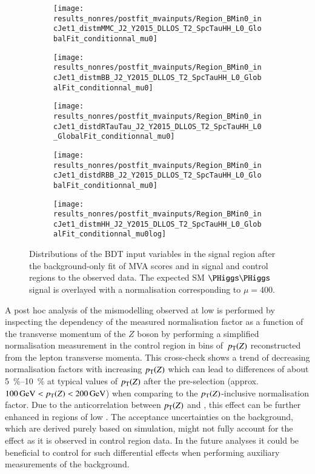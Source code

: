 \begin{figure}[htbp]
  \centering

  \begin{subfigure}{0.46\textwidth}
    \texttt{[image: results\_nonres/postfit\_mvainputs/Region\_BMin0\_incJet1\_distmMMC\_J2\_Y2015\_DLLOS\_T2\_SpcTauHH\_L0\_GlobalFit\_conditionnal\_mu0]}
  \end{subfigure}\hfill%
  \begin{subfigure}{0.46\textwidth}
    \texttt{[image: results\_nonres/postfit\_mvainputs/Region\_BMin0\_incJet1\_distmBB\_J2\_Y2015\_DLLOS\_T2\_SpcTauHH\_L0\_GlobalFit\_conditionnal\_mu0]}
  \end{subfigure}

  \begin{subfigure}{0.46\textwidth}
    \texttt{[image: results\_nonres/postfit\_mvainputs/Region\_BMin0\_incJet1\_distdRTauTau\_J2\_Y2015\_DLLOS\_T2\_SpcTauHH\_L0\_GlobalFit\_conditionnal\_mu0]}
  \end{subfigure}\hfill%
  \begin{subfigure}{0.46\textwidth}
    \texttt{[image: results\_nonres/postfit\_mvainputs/Region\_BMin0\_incJet1\_distdRBB\_J2\_Y2015\_DLLOS\_T2\_SpcTauHH\_L0\_GlobalFit\_conditionnal\_mu0]}
  \end{subfigure}

  \begin{subfigure}{0.46\textwidth}
    \texttt{[image: results\_nonres/postfit\_mvainputs/Region\_BMin0\_incJet1\_distmHH\_J2\_Y2015\_DLLOS\_T2\_SpcTauHH\_L0\_GlobalFit\_conditionnal\_mu0log]}
  \end{subfigure}

  \caption{Distributions of the BDT input variables in the \hadhad
    signal region after the background-only fit of MVA scores and \mll
    in signal and control regions to the observed data. The expected
    SM $\HH$ signal is overlayed with a normalisation corresponding to
    $\mu = 400$.}
  \label{fig:postfit_mva_inputs}
\end{figure}

A post hoc analysis of the mismodelling observed at low \dRtautau is
performed by inspecting the dependency of the measured \ZHF
normalisation factor as a function of the transverse momentum of the
$Z$ boson by performing a simplified normalisation measurement in the
control region in bins of~$p_{\text{T}}(Z)$ reconstructed from the lepton
transverse momenta. This cross-check shows a trend of decreasing \ZHF
normalisation factors with increasing $p_{\text{T}}(Z)$ which can lead to
differences of about \SIrange{5}{10}{\percent} at typical values of
$p_{\text{T}}(Z)$ after the \hadhad pre-selection (approx.\
$\SI{100}{\GeV} < \pT(Z) < \SI{200}{\GeV}$) when comparing to the
$p_{\text{T}}(Z)$-inclusive normalisation factor. Due to the anticorrelation
between $p_{\text{T}}(Z)$ and \dRtautau, this effect can be further enhanced in
regions of low \dRtautau. The acceptance uncertainties on the \ZHF
background, which are derived purely based on simulation, might not
fully account for the effect as it is observed in control region
data. In the future analyses it could be beneficial to control for
such differential effects when performing auxiliary measurements of
the \ZHF background.\todo{Put a plot in appendix?}

